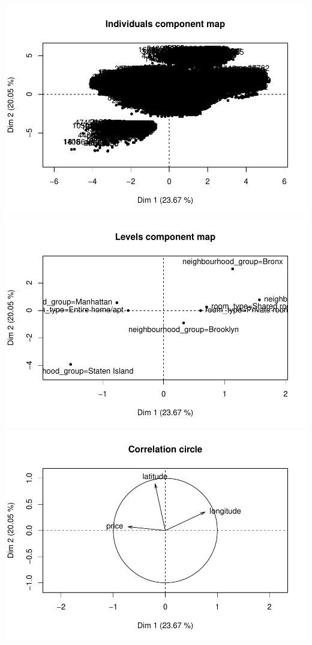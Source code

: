 \documentclass[
]{article}
\begin{document}
\includegraphics{project-code_files/figure-latex/unnamed-chunk-29-1.pdf}
\includegraphics{project-code_files/figure-latex/unnamed-chunk-29-2.pdf}
\includegraphics{project-code_files/figure-latex/unnamed-chunk-29-3.pdf}
\end{document}

